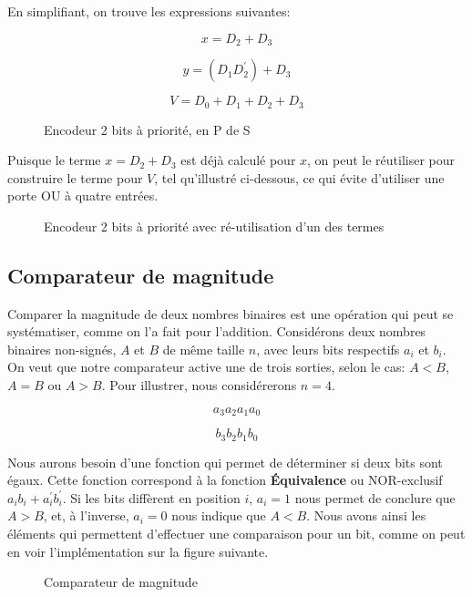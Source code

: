 \documentclass[11pt]{article}
\begin{document}
En simplifiant, on trouve les expressions suivantes:

$$ x = D_2 + D_3 $$

$$ y = (D_1 D_2^\prime) + D_3 $$

$$ V = D_0 + D_1 + D_2 + D_3 $$

\begin{figure}[htbp]
\centering

\caption{\label{fig:orga1c9c86}Encodeur 2 bits à priorité, en P de S}
\end{figure}

Puisque le terme \(x = D_2 + D_3\) est déjà calculé pour \(x\), on
peut le réutiliser pour construire le terme pour \(V\), tel
qu'illustré ci-dessous, ce qui évite d'utiliser une porte OU à quatre
entrées.

\begin{figure}[htbp]
\centering

\caption{\label{fig:org9240b93}Encodeur 2 bits à priorité avec ré-utilisation d'un des termes}
\end{figure}


\subsection{Comparateur de magnitude}
\label{sec:org454d9f0}

Comparer la magnitude de deux nombres binaires est une opération qui
peut se systématiser, comme on l'a fait pour l'addition. Considérons
deux nombres binaires non-signés, \(A\) et \(B\) de même taille \(n\),
avec leurs bits respectifs \(a_i\) et \(b_i\). On veut que notre
comparateur active une de trois sorties, selon le cas: \(A < B\), \(A
= B\) ou \(A > B\). Pour illustrer, nous considérerons \(n = 4\).

$$ a_3 a_2 a_1 a_0 $$

$$ b_3 b_2 b_1 b_0 $$

Nous aurons besoin d'une fonction qui permet de déterminer si deux
bits sont égaux. Cette fonction correspond à la fonction \textbf{Équivalence}
ou NOR-exclusif \(a_i b_i + a_i^\prime b_i^\prime\).  Si les bits
diffèrent en position \(i\), \(a_i = 1\) nous permet de conclure que
\(A > B\), et, à l'inverse, \(a_i = 0\) nous indique que \(A < B\). Nous avons ainsi
les éléments qui permettent d'effectuer une comparaison pour un bit,
comme on peut en voir l'implémentation sur la figure suivante.

\begin{figure}[htbp]
\centering

\caption{\label{fig:org252a6d7}Comparateur de magnitude}
\end{figure}
\end{document}
